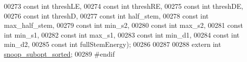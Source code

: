 \begin{DoxyCode}
00273                     \textcolor{keyword}{const} \textcolor{keywordtype}{int}   threshLE,
00274                     \textcolor{keyword}{const} \textcolor{keywordtype}{int}   threshRE,
00275                     \textcolor{keyword}{const} \textcolor{keywordtype}{int}   threshDE,
00276                     \textcolor{keyword}{const} \textcolor{keywordtype}{int}   threshD,
00277                     \textcolor{keyword}{const} \textcolor{keywordtype}{int}   half\_stem,
00278                     \textcolor{keyword}{const} \textcolor{keywordtype}{int}   max\_half\_stem,
00279                     \textcolor{keyword}{const} \textcolor{keywordtype}{int}   min\_s2,
00280                     \textcolor{keyword}{const} \textcolor{keywordtype}{int}   max\_s2,
00281                     \textcolor{keyword}{const} \textcolor{keywordtype}{int}   min\_s1,
00282                     \textcolor{keyword}{const} \textcolor{keywordtype}{int}   max\_s1,
00283                     \textcolor{keyword}{const} \textcolor{keywordtype}{int}   min\_d1,
00284                     \textcolor{keyword}{const} \textcolor{keywordtype}{int}   min\_d2,
00285                     \textcolor{keyword}{const} \textcolor{keywordtype}{int}   fullStemEnergy);
00286 
00287 
00288 \textcolor{keyword}{extern} \textcolor{keywordtype}{int} \mbox{\hyperlink{snoop_8h_a59d585f04a79327a07528666e4aebf7d}{snoop\_subopt\_sorted}};
00289 \textcolor{preprocessor}{#endif}
\end{DoxyCode}
